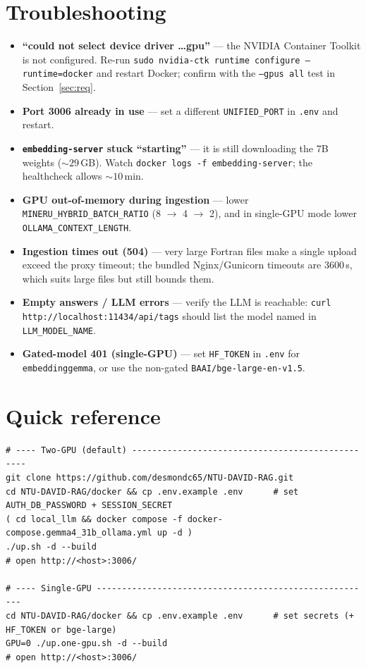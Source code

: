 \documentclass[11pt,a4paper]{article}
\newcommand{\code}[1]{\texttt{\small #1}}
\begin{document}
\section{Troubleshooting}
\begin{itemize}[leftmargin=1.4em,itemsep=3pt]
  \item \textbf{``could not select device driver \dots gpu''} --- the NVIDIA
        Container Toolkit is not configured. Re-run
        \code{sudo nvidia-ctk runtime configure --runtime=docker} and restart
        Docker; confirm with the \code{--gpus all} test in Section~\ref{sec:req}.
  \item \textbf{Port 3006 already in use} --- set a different
        \code{UNIFIED\_PORT} in \code{.env} and restart.
  \item \textbf{\code{embedding-server} stuck ``starting''} --- it is still
        downloading the 7B weights (${\sim}29$\,GB). Watch
        \code{docker logs -f embedding-server}; the healthcheck allows
        ${\sim}10$\,min.
  \item \textbf{GPU out-of-memory during ingestion} --- lower
        \code{MINERU\_HYBRID\_BATCH\_RATIO} (8 $\rightarrow$ 4 $\rightarrow$ 2),
        and in single-GPU mode lower \code{OLLAMA\_CONTEXT\_LENGTH}.
  \item \textbf{Ingestion times out (504)} --- very large Fortran files make a
        single upload exceed the proxy timeout; the bundled Nginx/Gunicorn
        timeouts are 3600\,s, which suits large files but still bounds them.
  \item \textbf{Empty answers / LLM errors} --- verify the LLM is reachable:
        \code{curl http://localhost:11434/api/tags} should list the model named
        in \code{LLM\_MODEL\_NAME}.
  \item \textbf{Gated-model 401 (single-GPU)} --- set \code{HF\_TOKEN} in
        \code{.env} for \code{embeddinggemma}, or use the non-gated
        \code{BAAI/bge-large-en-v1.5}.
\end{itemize}

\section{Quick reference}
\begin{lstlisting}
# ---- Two-GPU (default) -------------------------------------------------
git clone https://github.com/desmondc65/NTU-DAVID-RAG.git
cd NTU-DAVID-RAG/docker && cp .env.example .env      # set AUTH_DB_PASSWORD + SESSION_SECRET
( cd local_llm && docker compose -f docker-compose.gemma4_31b_ollama.yml up -d )
./up.sh -d --build
# open http://<host>:3006/

# ---- Single-GPU -------------------------------------------------------
cd NTU-DAVID-RAG/docker && cp .env.example .env      # set secrets (+ HF_TOKEN or bge-large)
GPU=0 ./up.one-gpu.sh -d --build
# open http://<host>:3006/
\end{lstlisting}
\end{document}
